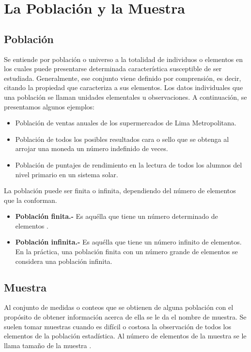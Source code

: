 \section{La Población y la Muestra}
    \subsection{Población}
        Se entiende por población o universo a la totalidad de individuos o elementos 
        en los cuales puede presentarse determinada característica susceptible de ser 
        estudiada. Generalmente, ese conjunto viene definido por comprensión, es decir, 
        citando la propiedad que caracteriza a sus elementos. Los datos individuales que una
        población se llaman unidades elementales u observaciones. A continuación, se presentamos
        algunos ejemplos: 
        \begin{itemize}
            \item Población de ventas anuales de los supermercados de Lima Metropolitana.
            \item Población de todos los posibles resultados cara o sello que se obtenga al arrojar una moneda un número indefinido de veces.
            \item Población de puntajes de rendimiento en la lectura de todos los alumnos del nivel primario en un sistema solar.
        \end{itemize}
        La población puede ser finita o infinita, dependiendo del número de elementos que la conforman.
        \begin{itemize}
            \item \textbf{Población finita.-} Es aquélla que tiene un número determinado de elementos .
            \item \textbf{Población infinita.-} Es aquélla que tiene un número infinito de elementos. En la práctica, una población finita con un número grande de elementos se considera una población infinita.
        \end{itemize}
    \subsection{Muestra}
        Al conjunto de medidas o conteos que se obtienen de alguna población
        con el propósito de obtener información acerca de ella se le da el nombre de muestra. 
        Se suelen tomar muestras cuando es difícil o costosa la observación de todos los
        elementos de la población estadística. Al número de elementos de la muestra 
        se le llama tamaño de la muestra .